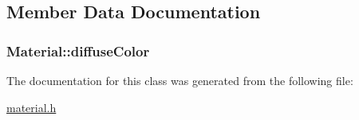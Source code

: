 \subsection{Member Data Documentation}
\hypertarget{classMaterial_ae81bccaee22b88d46074b843dc7bdc32}{
\subsubsection[{diffuse\+Color}]{ Material\+::diffuse\+Color\hspace{0.3cm}{\ttfamily [protected]}}}\label{classMaterial_ae81bccaee22b88d46074b843dc7bdc32}


The documentation for this class was generated from the following file\+:\begin{DoxyCompactItemize}
\item 
\hyperlink{material_8h}{material.\+h}\end{DoxyCompactItemize}
